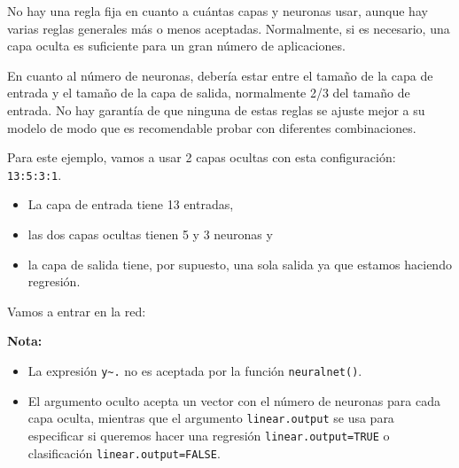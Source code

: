 \documentclass[]{book}
\newenvironment{Shaded}{\begin{snugshade}}{\end{snugshade}}
\newcommand{\KeywordTok}[1]{\textcolor[rgb]{0.13,0.29,0.53}{\textbf{#1}}}
\newcommand{\DataTypeTok}[1]{\textcolor[rgb]{0.13,0.29,0.53}{#1}}
\newcommand{\DecValTok}[1]{\textcolor[rgb]{0.00,0.00,0.81}{#1}}
\newcommand{\StringTok}[1]{\textcolor[rgb]{0.31,0.60,0.02}{#1}}
\newcommand{\OtherTok}[1]{\textcolor[rgb]{0.56,0.35,0.01}{#1}}
\newcommand{\OperatorTok}[1]{\textcolor[rgb]{0.81,0.36,0.00}{\textbf{#1}}}
\newcommand{\NormalTok}[1]{#1}
\begin{document}
No hay una regla fija en cuanto a cuántas capas y neuronas usar, aunque
hay varias reglas generales más o menos aceptadas. Normalmente, si es
necesario, una capa oculta es suficiente para un gran número de
aplicaciones.

En cuanto al número de neuronas, debería estar entre el tamaño de la
capa de entrada y el tamaño de la capa de salida, normalmente 2/3 del
tamaño de entrada. No hay garantía de que ninguna de estas reglas se
ajuste mejor a su modelo de modo que es recomendable probar con
diferentes combinaciones.

Para este ejemplo, vamos a usar 2 capas ocultas con esta configuración:
\texttt{13:5:3:1}.

\begin{itemize}
\item
  La capa de entrada tiene 13 entradas,
\item
  las dos capas ocultas tienen 5 y 3 neuronas y
\item
  la capa de salida tiene, por supuesto, una sola salida ya que estamos
  haciendo regresión.
\end{itemize}

Vamos a entrar en la red:

\begin{Shaded}
\end{Shaded}

\textbf{Nota:}

\begin{itemize}
\item
  La expresión \texttt{y\textasciitilde{}.} no es aceptada por la
  función \texttt{neuralnet()}.
\item
  El argumento oculto acepta un vector con el número de neuronas para
  cada capa oculta, mientras que el argumento \texttt{linear.output} se
  usa para especificar si queremos hacer una regresión
  \texttt{linear.output=TRUE} o clasificación
  \texttt{linear.output=FALSE}.
\end{itemize}
\end{document}

